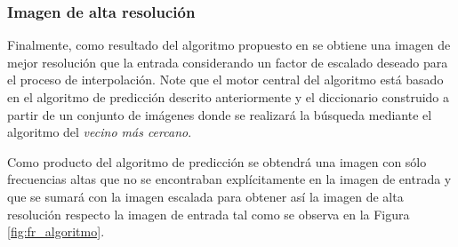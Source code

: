 \subsubsection{Imagen de alta resolución}
\noindent
Finalmente, como resultado del algoritmo propuesto en \cite{freeman} se obtiene
una imagen de mejor resolución que la entrada considerando un factor de escalado
deseado para el proceso de interpolación. Note que el motor central del algoritmo
está basado en el algoritmo de predicción descrito anteriormente y el diccionario
construido a partir de un conjunto de imágenes donde se realizará la búsqueda
mediante el algoritmo del \emph{vecino más cercano}. 

Como producto del algoritmo de predicción se obtendrá una imagen con sólo frecuencias
altas que no se encontraban explícitamente en la imagen de entrada y que se sumará
con la imagen escalada para obtener así la imagen de alta resolución respecto
la imagen de entrada tal como se observa en la Figura \ref{fig:fr_algoritmo}.